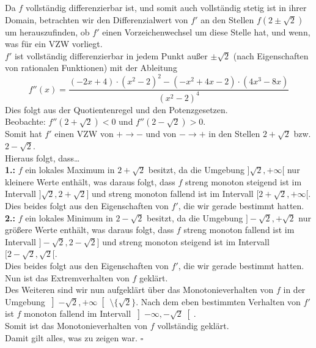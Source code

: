 \documentclass[12pt, a4paper]{article}
\newcommand*{\qed}{\null\nobreak\hfill\ensuremath{\square}}
\begin{document}
Da \(f\) vollständig differenzierbar ist, und somit auch vollständig stetig ist in ihrer Domain, betrachten wir den Differenzialwert von \(f'\) an den Stellen \(f(2 \pm \sqrt{2})\) um herauszufinden, ob \(f'\) einen Vorzeichenwechsel um diese Stelle hat, und wenn, was für ein VZW vorliegt. \\
\(f'\) ist vollständig differenzierbar in jedem Punkt außer \(\pm\sqrt{2}\) (nach Eigenschaften von rationalen Funktionen) mit der Ableitung \[f''(x) = \frac{(-2x+4) \cdot (x^2-2)^2 - (-x^2 + 4x -2) \cdot (4x^3-8x)}{(x^2-2)^4}\]
Dies folgt aus der Quotientenregel und den Potenzgesetzen. \\
Beobachte: \(f''(2 + \sqrt{2}) < 0\) und \(f''(2 - \sqrt{2}) > 0\). \\
Somit hat \(f'\) einen VZW von \(+ \rightarrow -\) und von \(- \rightarrow +\) in den Stellen \(2 + \sqrt{2}\) bzw. \(2 - \sqrt{2}\). \\
Hieraus folgt, dass\dots \pagebreak \\
\textbf{1.:} \(f\) ein lokales Maximum in \(2 + \sqrt{2}\) besitzt, da die Umgebung \(]\sqrt{2}, +\infty[\) nur kleinere Werte enthält, was daraus folgt, dass \(f\) streng monoton steigend ist im Intervall \(]\sqrt{2}, 2+\sqrt{2}]\) und streng monoton fallend ist im Intervall \([2+\sqrt{2}, +\infty[\). \\
Dies beides folgt aus den Eigenschaften von \(f'\), die wir gerade bestimmt hatten. \\
\textbf{2.:} \(f\) ein lokales Minimum in \(2 - \sqrt{2}\) besitzt, da die Umgebung \(]- \sqrt{2}, + \sqrt{2}\) nur größere Werte enthält, was daraus folgt, dass \(f\) streng monoton fallend ist im Intervall \(] - \sqrt{2}, 2 - \sqrt{2}]\) und streng monoton steigend ist im Intervall \([2 - \sqrt{2}, \sqrt{2}[\). \\
Dies beides folgt aus den Eigenschaften von \(f'\), die wir gerade bestimmt hatten. \\
Nun ist das Extremverhalten von \(f\) geklärt.\\
Des Weiteren sind wir nun aufgeklärt über das Monotonieverhalten von \(f\) in der Umgebung \(\left]-\sqrt{2}, +\infty\right[\  \setminus \{\sqrt{2}\}\). Nach dem eben bestimmten Verhalten von \(f'\) ist \(f\) monoton fallend im Intervall \(\left]-\infty, -\sqrt{2}\right[\).\\
Somit ist das Monotonieverhalten von \(f\) vollständig geklärt.\\
Damit gilt alles, was zu zeigen war. \qed \pagebreak
\end{document}
